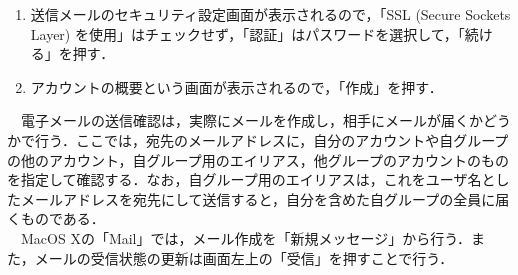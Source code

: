 \documentclass[a4j,titlepage]{jarticle}
\begin{document}
\begin{enumerate}
\item 送信メールのセキュリティ設定画面が表示されるので，「SSL (Secure Sockets Layer) を使用」はチェックせず，「認証」はパスワードを選択して，「続ける」を押す．

\item アカウントの概要という画面が表示されるので，「作成」を押す．

\end{enumerate}

　電子メールの送信確認は，実際にメールを作成し，相手にメールが届くかどうかで行う．ここでは，宛先のメールアドレスに，自分のアカウントや自グループの他のアカウント，自グループ用のエイリアス，他グループのアカウントのものを指定して確認する．なお，自グループ用のエイリアスは，これをユーザ名としたメールアドレスを宛先にして送信すると，自分を含めた自グループの全員に届くものである．\\
　MacOS Xの「Mail」では，メール作成を「新規メッセージ」から行う．また，メールの受信状態の更新は画面左上の「受信」を押すことで行う．
\end{document}
